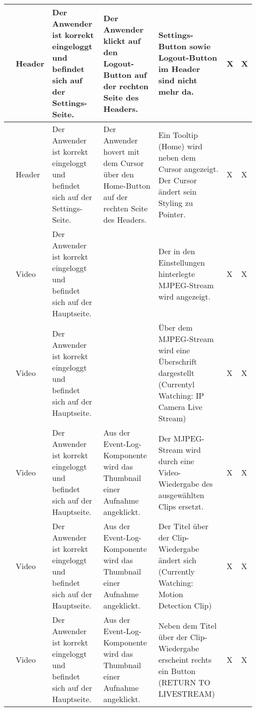 \begin{longtable}{| p{} | p{} | p{} | p{} | p{} | p{} | p{} |}
	\stepcounter{TestNumber}\arabic{TestNumber} & Header & Der Anwender ist korrekt eingeloggt und befindet sich auf der Settings-Seite. & Der Anwender klickt auf den Logout-Button auf der rechten Seite des Headers. & Settings-Button sowie Logout-Button im Header sind nicht mehr da. & X & X \\ \hline
	
	\stepcounter{TestNumber}\arabic{TestNumber} & Header & Der Anwender ist korrekt eingeloggt und befindet sich auf der Settings-Seite. & Der Anwender hovert mit dem Cursor über den Home-Button auf der rechten Seite des Headers. & Ein Tooltip (Home) wird neben dem Cursor angezeigt. Der Cursor ändert sein Styling zu Pointer. & X & X \\ \hline
	
	\stepcounter{TestNumber}\arabic{TestNumber} & Video & Der Anwender ist korrekt eingeloggt und befindet sich auf der Hauptseite. & & Der in den Einstellungen hinterlegte MJPEG-Stream wird angezeigt. & X & X \\ \hline	
	
	\stepcounter{TestNumber}\arabic{TestNumber} & Video & Der Anwender ist korrekt eingeloggt und befindet sich auf der Hauptseite. & & Über dem MJPEG-Stream wird eine Überschrift dargestellt (Currentyl Watching: IP Camera Live Stream) & X & X \\ \hline	
	
	\stepcounter{TestNumber}\arabic{TestNumber} & Video & Der Anwender ist korrekt eingeloggt und befindet sich auf der Hauptseite. & Aus der Event-Log-Komponente wird das Thumbnail einer Aufnahme angeklickt. & Der MJPEG-Stream wird durch eine Video-Wiedergabe des ausgewählten Clips ersetzt. & X & X \\ \hline
	
	\stepcounter{TestNumber}\arabic{TestNumber} & Video & Der Anwender ist korrekt eingeloggt und befindet sich auf der Hauptseite. & Aus der Event-Log-Komponente wird das Thumbnail einer Aufnahme angeklickt. & Der Titel über der Clip-Wiedergabe ändert sich (Currently Watching: Motion Detection Clip) & X & X \\ \hline
	
	\stepcounter{TestNumber}\arabic{TestNumber} & Video & Der Anwender ist korrekt eingeloggt und befindet sich auf der Hauptseite. & Aus der Event-Log-Komponente wird das Thumbnail einer Aufnahme angeklickt. & Neben dem Titel über der Clip-Wiedergabe erscheint rechts ein Button (RETURN TO LIVESTREAM) & X & X \\ \hline
	

\end{longtable}
